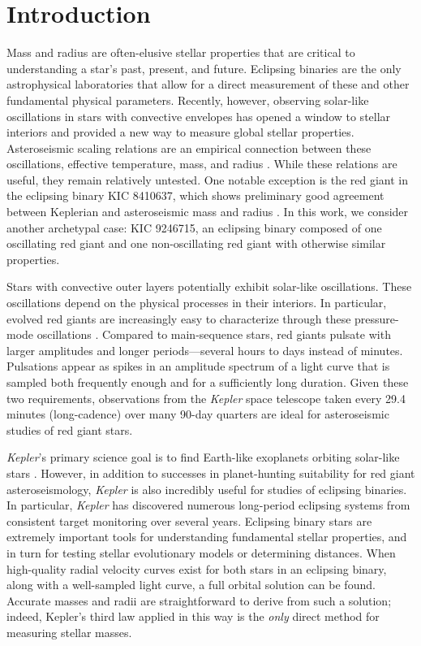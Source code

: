\section{Introduction}\label{intro}

Mass and radius are often-elusive stellar properties that are critical to understanding a star's past, present, and future. Eclipsing binaries are the only astrophysical laboratories that allow for a direct measurement of these and other fundamental physical parameters. Recently, however, observing solar-like oscillations in stars with convective envelopes has opened a window to stellar interiors and provided a new way to measure global stellar properties. Asteroseismic scaling relations are an empirical connection between these oscillations, effective temperature, mass, and radius \citep{kje95,hub10,mos13}. While these relations are useful, they remain relatively untested. One notable exception is the red giant in the eclipsing binary KIC 8410637, which shows preliminary good agreement between Keplerian and asteroseismic mass and radius \citep{fra13}. In this work, we consider another archetypal case: KIC 9246715, an eclipsing binary composed of one oscillating red giant and one non-oscillating red giant with otherwise similar properties.

Stars with convective outer layers potentially exhibit solar-like oscillations. These oscillations depend on the physical processes in their interiors. In particular, evolved red giants are increasingly easy to characterize through these pressure-mode oscillations \citep[for a review of this topic, see][]{cha13}. Compared to main-sequence stars, red giants pulsate with larger amplitudes and longer periods---several hours to days instead of minutes. Pulsations appear as spikes in an amplitude spectrum of a light curve that is sampled both frequently enough and for a sufficiently long duration. Given these two requirements, observations from the \emph{Kepler} space telescope taken every 29.4 minutes (long-cadence) over many 90-day quarters are ideal for asteroseismic studies of red giant stars.

\emph{Kepler}'s primary science goal is to find Earth-like exoplanets orbiting solar-like stars \citep{bor10}. However, in addition to successes in planet-hunting suitability for red giant asteroseismology, \emph{Kepler} is also incredibly useful for studies of eclipsing binaries. In particular, \emph{Kepler} has discovered numerous long-period eclipsing systems from consistent target monitoring over several years. Eclipsing binary stars are extremely important tools for understanding fundamental stellar properties, and in turn for testing stellar evolutionary models or determining distances. When high-quality radial velocity curves exist for both stars in an eclipsing binary, along with a well-sampled light curve, a full orbital solution can be found. Accurate masses and radii are straightforward to derive from such a solution; indeed, Kepler's third law applied in this way is the \emph{only} direct method for measuring stellar masses.

